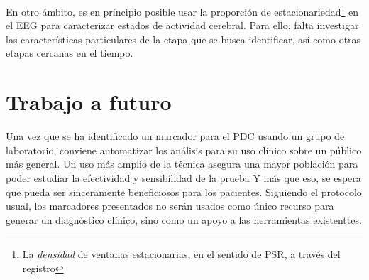 En otro ámbito, es en principio posible usar la
proporción de estacionariedad\footnote{La \textit{densidad} de ventanas estacionarias, en el sentido de
PSR, a través del registro} en el EEG para caracterizar estados de actividad cerebral. Para ello, falta 
investigar las características particulares de la etapa que se busca identificar, así como otras
etapas cercanas en el tiempo.


\section{Trabajo a futuro}

%

Una vez que se ha identificado un marcador para el PDC usando un grupo de laboratorio,
conviene automatizar los análisis para su uso clínico sobre un público más general.
%
Un uso más amplio de la técnica asegura una mayor población para poder estudiar la 
efectividad y sensibilidad de la prueba
Y más que eso, se espera que pueda ser sinceramente beneficiosos para los pacientes. Siguiendo el
protocolo usual, los marcadores presentados no serán usados como único recurso para generar
un diagnóstico clínico, sino como un apoyo a las herramientas existenttes.

